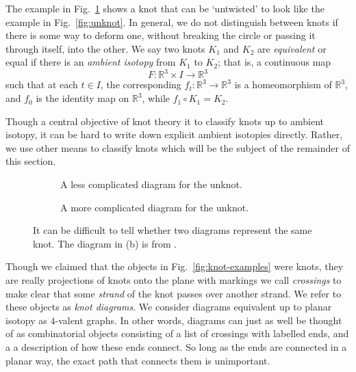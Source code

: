 \documentclass[12pt]{report}
\newcommand{\R}{\mathbb{R}}
\theoremstyle{upright}
\begin{document}
The example in Fig.~\ref{fig:unknot-twisted} shows a knot that can be `untwisted' to look like the example in Fig.~\ref{fig:unknot}. In general, we do not distinguish between knots if there is some way to deform one, without breaking the circle or passing it through itself, into the other. We say two knots $K_{1}$ and $K_{2}$ are \textit{equivalent} or equal if there is an \textit{ambient isotopy} from $K_{1}$ to $K_{2}$; that is, a continuous map
\[F: \R^{3} \times I \longrightarrow \R^{3}\]
such that at each $t \in I$, the corresponding $f_{t}: \R^{3} \longrightarrow \R^{3}$ is a homeomorphism of $\R^{3}$, and $f_{0}$ is the identity map on $\R^{3}$, while $f_{1} \circ K_{1} = K_{2}$.

Though a central objective of knot theory it to classify knots up to ambient isotopy, it can be hard to write down explicit ambient isotopies directly. Rather, we use other means to classify knots which will be the subject of the remainder of this section.

\begin{figure}[hbt]
	\centering
	\hspace*{\fill}
	\begin{subfigure}[b]{0.35 \textwidth}
		\centering
		\def\svgscale{0.2}
		
		\caption{A less complicated diagram for the unknot.}
		\label{fig:unknot-twisted}
	\end{subfigure}
	\hspace*{\fill}
	\begin{subfigure}[b]{0.35 \textwidth}
		\centering
		\def\svgscale{0.2}
		
		\caption{A more complicated diagram for the unknot.}
		\label{fig:unknot-goertiz}
	\end{subfigure}
	\hspace*{\fill}
	\caption{It can be difficult to tell whether two diagrams represent the same knot. The diagram in (b) is from \cite{notes-on-knot-theory}.}
	\label{fig:more-unknots}
\end{figure}

Though we claimed that the objects in Fig.~\ref{fig:knot-examples} were knots, they are really projections of knots onto the plane with markings we call \textit{crossings} to make clear that some \textit{strand} of the knot passes over another strand. We refer to these objects as \textit{knot diagrams}. We consider diagrams equivalent up to planar isotopy as $4$-valent graphs. In other words, diagrams can just as well be thought of as combinatorial objects consisting of a list of crossings with labelled ends, and a a description of how these ends connect. So long as the ends are connected in a planar way, the exact path that connects them is unimportant.
\end{document}
